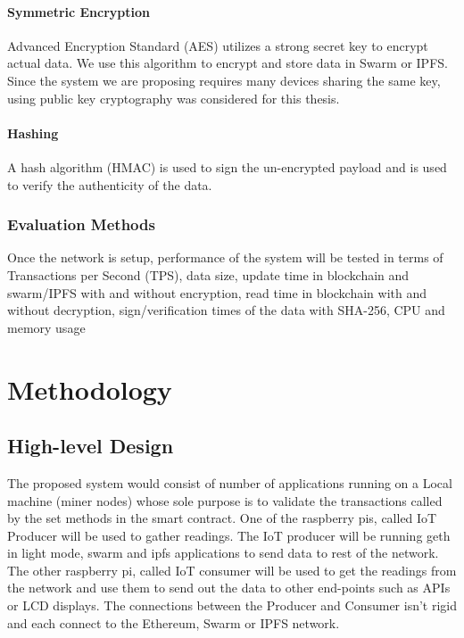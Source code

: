 \documentclass[11pt,openright]{report}
\begin{document}
\subsubsection{Symmetric Encryption}
Advanced Encryption Standard (AES) utilizes a strong secret key to encrypt actual data. We use this algorithm to encrypt and store data in Swarm or IPFS. Since the system we are proposing requires many devices sharing the same key, using public key cryptography was considered for this thesis.  
\subsubsection{Hashing}
A hash algorithm (HMAC) is used to sign the un-encrypted payload and is used to verify the authenticity of the data.

\subsection{Evaluation Methods}
Once the network is setup, performance of the system will be tested in terms of Transactions per Second (TPS), data size, update time in blockchain and swarm/IPFS with and without encryption, read time in blockchain with and without decryption, sign/verification times of the data with SHA-256, CPU and memory usage

\chapter{Methodology} \label{chapter:proposed_system}

\section{High-level Design} \label{ss:construct_architecture}
The proposed system would consist of number of applications running on a Local machine (miner nodes) whose sole purpose is to validate the transactions called by the set methods in the smart contract. One of the raspberry pis, called IoT Producer will be used to gather readings. The IoT producer will be running geth in light mode, swarm and ipfs applications to send data to rest of the network. The other raspberry pi, called IoT consumer will be used to get the readings from the network and use them to send out the data to other end-points such as APIs or LCD displays. The connections between the Producer and Consumer isn't rigid and each connect to the Ethereum, Swarm or IPFS network.
\end{document}
